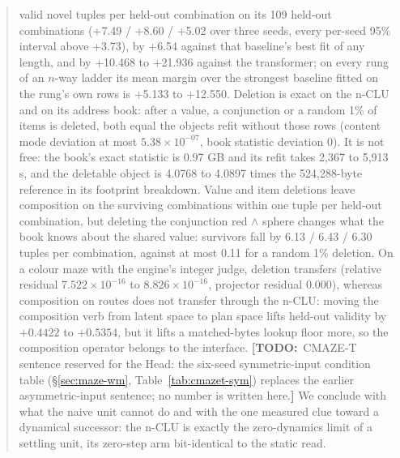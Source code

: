 \documentclass{article} %
\newcommand{\TODO}[1]{{\color{orange}\textbf{[TODO:}~#1\textbf{]}}}
\newcommand{\sci}[2]{\ensuremath{#1\times10^{#2}}}
\begin{document}
\begin{abstract}
valid novel tuples per held-out combination on its 109 held-out combinations (+7.49 / +8.60 / +5.02 over three seeds,
every per-seed 95\% interval above +3.73), by +6.54 against that baseline's best fit of any length, and
by +10.468 to +21.936 against the transformer; on every rung of an $n$-way ladder its mean margin
over the strongest baseline fitted on the rung's own rows is +5.133 to +12.550.
Deletion is exact on the n-CLU and on its address book: after a value, a conjunction or a random
1\% of items is deleted, both equal the objects refit without those rows (content mode deviation at
most \sci{5.38}{-07}, book statistic deviation 0). It is not free: the book's exact statistic is %
0.97 GB and its refit takes 2,367 to 5,913 s, and the deletable object is 4.0768 to 4.0897 times %
the 524,288-byte reference in its footprint breakdown. Value and item deletions leave composition on %
the surviving combinations within one tuple per held-out combination, but deleting the conjunction red $\wedge$ sphere
changes what the book knows about the shared value: survivors fall by 6.13 / 6.43 / 6.30 tuples per %
combination, against at most 0.11 for a random 1\% deletion. %
On a colour maze with the engine's integer judge, deletion transfers
(relative residual \sci{7.522}{-16} to \sci{8.826}{-16}, projector residual 0.000), %
whereas composition on routes does not transfer through the n-CLU: moving the composition verb from
latent space to plan space lifts held-out validity by $+0.4422$ to $+0.5354$, but it lifts a matched-bytes lookup floor more, so the composition operator belongs to the interface.
\TODO{CMAZE-T sentence reserved for the Head: the six-seed symmetric-input condition table
(\S\ref{sec:maze-wm}, Table~\ref{tab:cmazet-sym}) replaces the earlier asymmetric-input sentence; no
number is written here.}
We conclude with what the naive unit cannot do and with the one measured clue toward a
dynamical successor: the n-CLU is exactly the zero-dynamics limit of a settling unit, its zero-step arm bit-identical to the static read. %
\end{abstract}
\end{document}
